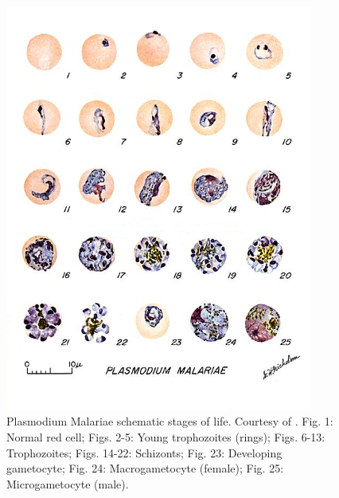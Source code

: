 \documentclass[final,a4paper,12pt,english]{UnicaPhdThesis3}
\begin{document}
{\begin{figure}[!htbp]
	\centering
	\includegraphics[width=0.90\textwidth]{images/malaria_th/mal_mal}
	\caption{\label{fig:mal_th} Plasmodium Malariae schematic stages of life. Courtesy of \cite{Med_cdc}.
		Fig. 1: Normal red cell; Figs. 2-5: Young trophozoites (rings); Figs. 6-13: Trophozoites; Figs. 14-22: Schizonts; Fig. 23: Developing gametocyte; Fig. 24: Macrogametocyte (female); Fig. 25: Microgametocyte (male).}
\end{figure}

}
\end{document}
